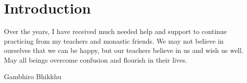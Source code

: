 \chapter{Introduction}

Over the years, I have received much needed help and support to continue
practicing from my teachers and monastic friends. We may not believe in
ourselves that we can be happy, but our teachers believe in us and wish
us well. May all beings overcome confusion and flourish in their lives.

Gambhīro Bhikkhu
